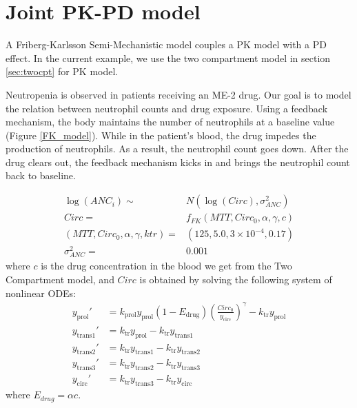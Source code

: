 \documentclass[10pt, reqno, oneside]{amsbook}
\numberwithin{equation}{chapter}
\numberwithin{figure}{chapter}
\numberwithin{table}{chapter}
\theoremstyle{remark}
\begin{document}
\section{Joint PK-PD model}
\label{sec:org6b932de}

A Friberg-Karlsson Semi-Mechanistic model \cite{friberg_mechanistic_2003} couples
a PK model with a PD
effect. In the current example, we use the two compartment model in section \ref{sec:twocpt} for
PK model.

Neutropenia is observed in patients receiving an ME-2 drug. Our goal
is to model the relation between neutrophil counts and drug
exposure. Using a feedback mechanism, the body maintains the number of
neutrophils at a baseline value (Figure \ref{FK_model}). While in the
patient's blood, the drug impedes the production of neutrophils. As a
result, the neutrophil count goes down. After the drug clears out, the
feedback mechanism kicks in and brings the neutrophil count back to
baseline.

\begin{align}
  \log(ANC_i) \sim& N(\log(Circ), \sigma^2_{ANC})  \\
  Circ =& f_{FK}(MTT, Circ_{0}, \alpha, \gamma, c)  \\
  (MTT, Circ_{0}, \alpha, \gamma, ktr) =& (125, 5.0, 3 \times 10^{-4}, 0.17) \\
  \sigma^2_{ANC} =& 0.001
\end{align}
where \(c\) is the drug concentration in the blood we get from the Two
Compartment model, and \(Circ\) is obtained by solving the following
system of nonlinear ODEs:
\begin{subequations}
  \begin{align}
   y_\mathrm{prol}' &= k_\mathrm{prol} y_\mathrm{prol} (1 - E_\mathrm{drug})\left(\frac{Circ_0}{y_\mathrm{circ}}\right)^\gamma - k_\mathrm{tr}y_\mathrm{prol} \\
   y_\mathrm{trans1}' &= k_\mathrm{tr} y_\mathrm{prol} - k_\mathrm{tr} y_\mathrm{trans1} \\
   y_\mathrm{trans2}' &= k_\mathrm{tr} y_\mathrm{trans1} - k_\mathrm{tr} y_\mathrm{trans2}  \\
   y_\mathrm{trans3}' &= k_\mathrm{tr} y_\mathrm{trans2} - k_\mathrm{tr} y_\mathrm{trans3}  \\
   y_\mathrm{circ}' &= k_\mathrm{tr} y_\mathrm{trans3} - k_\mathrm{tr} y_\mathrm{circ}
   \end{align}
   \label{eq:FK}
\end{subequations}
where \(E_{drug}  = \alpha c\).
\end{document}

